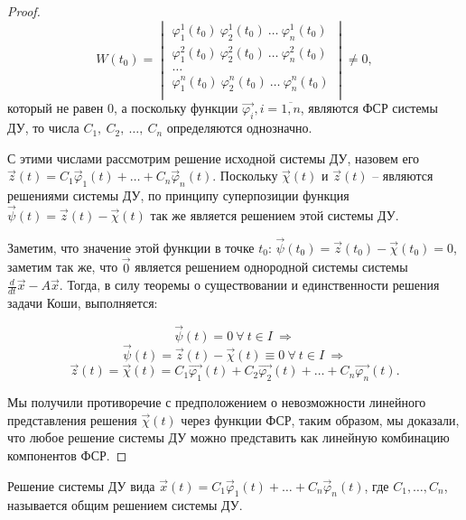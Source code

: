 \begin{proof}
    \begin{equation}
        W(t_0) = 
        \begin{vmatrix}
        \varphi_1^1(t_0) ~ \varphi_2^1(t_0) ~ \dots ~ \varphi_n^1(t_0) \\
        \varphi_1^2(t_0) ~ \varphi_2^2(t_0) ~ \dots ~ \varphi_n^2(t_0) \\
        \dots \\
        \varphi_1^n(t_0) ~ \varphi_2^n(t_0) ~ \dots ~ \varphi_n^n(t_0) \\
        \end{vmatrix} \neq 0,
    \end{equation}
    который не равен $0$, а поскольку функции $\overrightarrow{\varphi_i}, i = \overline{1, n}$, являются ФСР системы ДУ, то числа $C_1, ~ C_2, ~ \dots, ~ C_n$ определяются однозначно.
    
    С этими числами рассмотрим решение исходной системы ДУ, назовем его $\overrightarrow{z}(t) = C_1 \overrightarrow \varphi_1(t) + \dots + C_n \overrightarrow \varphi_n(t)$. Поскольку $\overrightarrow{\chi}(t)$ и $\overrightarrow{z}(t)$ -- являются решениями системы ДУ, по принципу суперпозиции функция $\overrightarrow{\psi}(t) = \overrightarrow{z}(t) - \overrightarrow{\chi}(t)$ так же является решением этой системы ДУ.
    
    Заметим, что значение этой функции в точке $t_0$: $\overrightarrow{\psi}(t_0) = \overrightarrow{z}(t_0) - \overrightarrow{\chi}(t_0) = 0$, заметим так же, что $\overrightarrow{0}$ является решением однородной системы системы $\frac{d}{dt} \overrightarrow{x} - A \overrightarrow{x}$. Тогда, в силу теоремы о существовании и единственности решения задачи Коши, выполняется:
    
    \[ \overrightarrow{\psi}(t) = 0 ~ \forall ~ t \in I ~ \Rightarrow \]
    \[ \overrightarrow{\psi}(t) = \overrightarrow{z}(t) - \overrightarrow{\chi}(t) \equiv 0 ~ \forall ~ t \in I ~ \Rightarrow \]
    \[ \overrightarrow{z}(t) = \overrightarrow{\chi}(t) = C_1 \overrightarrow{\varphi_1}(t) + C_2 \overrightarrow{\varphi_2}(t) + \dots + C_n \overrightarrow{\varphi_n}(t).\]
    
    Мы получили противоречие с предположением о невозможности линейного представления решения $\overrightarrow{\chi}(t)$ через функции ФСР, таким образом, мы доказали, что любое решение системы ДУ можно представить как линейную комбинацию компонентов ФСР.
\end{proof}

\begin{definition}
    Решение системы ДУ вида $\overrightarrow x(t) = C_1 \overrightarrow \varphi_1(t) + \dots + C_n \overrightarrow \varphi_n(t)$, где $C_1, \dots, C_n$,
    называется общим решением системы ДУ.
\end{definition}

